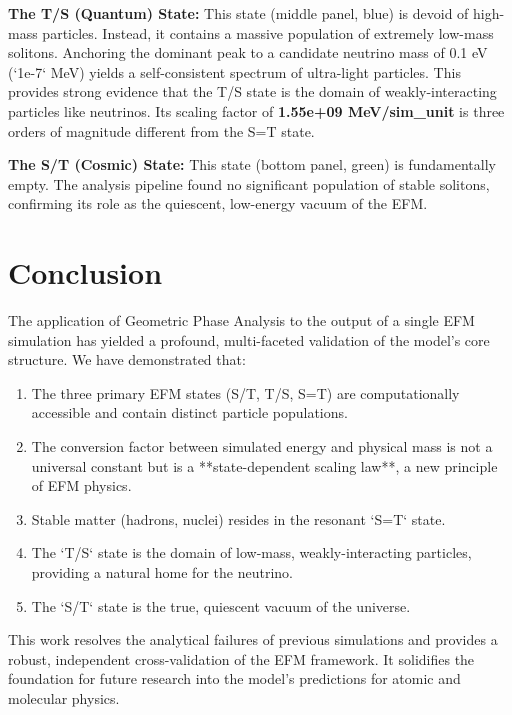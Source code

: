 \documentclass[11pt]{article}
\begin{document}
\textbf{The T/S (Quantum) State:} This state (middle panel, blue) is devoid of high-mass particles. Instead, it contains a massive population of extremely low-mass solitons. Anchoring the dominant peak to a candidate neutrino mass of 0.1 eV (`1e-7` MeV) yields a self-consistent spectrum of ultra-light particles. This provides strong evidence that the T/S state is the domain of weakly-interacting particles like neutrinos. Its scaling factor of \textbf{1.55e+09 MeV/sim\_unit} is three orders of magnitude different from the S=T state.

\textbf{The S/T (Cosmic) State:} This state (bottom panel, green) is fundamentally empty. The analysis pipeline found no significant population of stable solitons, confirming its role as the quiescent, low-energy vacuum of the EFM.

\section{Conclusion}
The application of Geometric Phase Analysis to the output of a single EFM simulation has yielded a profound, multi-faceted validation of the model's core structure. We have demonstrated that:
\begin{enumerate}
    \item The three primary EFM states (S/T, T/S, S=T) are computationally accessible and contain distinct particle populations.
    \item The conversion factor between simulated energy and physical mass is not a universal constant but is a **state-dependent scaling law**, a new principle of EFM physics.
    \item Stable matter (hadrons, nuclei) resides in the resonant `S=T` state.
    \item The `T/S` state is the domain of low-mass, weakly-interacting particles, providing a natural home for the neutrino.
    \item The `S/T` state is the true, quiescent vacuum of the universe.
\end{enumerate}
This work resolves the analytical failures of previous simulations and provides a robust, independent cross-validation of the EFM framework. It solidifies the foundation for future research into the model's predictions for atomic and molecular physics.
\end{document}
